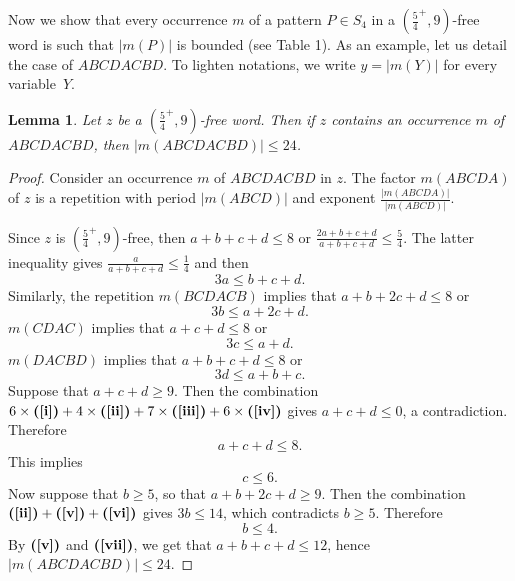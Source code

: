 \documentclass[final]{dmtcs-episciences}
\def\paren#1{\left( #1 \right)}
\renewcommand{\le}{\leqslant}
\renewcommand{\ge}{\geqslant}
\theoremstyle{plain}
\newtheorem{lemma}[theorem]{Lemma}
\theoremstyle{definition}
\theoremstyle{remark}
\begin{document}
Now we show that every occurrence $m$ of a pattern $P\in S_4$ in a $\paren{\tfrac54^+,9}$-free word
is such that $|m(P)|$ is bounded (see Table 1).
%
As an example, let us detail the case of $ABCDACBD$. %
To lighten notations, we write $y=|m(Y)|$ for every variable~$Y$.
\begin{lemma}\label{lem:bounded}
Let $z$ be a $\paren{\tfrac54^+, 9}$-free word. Then if $z$ contains an occurrence $m$ of $ABCDACBD$, then $|m(ABCDACBD)|\le24$.
\end{lemma}

\begin{proof}
Consider an occurrence $m$ of $ABCDACBD$ in $z$. The factor $m(ABCDA)$ of $z$ is a repetition with period $|m(ABCD)|$ and exponent $\tfrac{|m(ABCDA)|}{|m(ABCD)|}$.

Since $z$ is $\paren{\tfrac54^+,9}$-free, then $a+b+c+d\le8$ or $\tfrac{2a+b+c+d}{a+b+c+d}\le\tfrac54$.
The latter inequality gives $\tfrac{a}{a+b+c+d}\le\tfrac14$ and then
\begin{equation}\label{i}
3a\le b+c+d.
\end{equation}
Similarly, the repetition $m(BCDACB)$ implies that $a+b+2c+d\le8$ or
\begin{equation}\label{ii}
3b\le a+2c+d.
\end{equation}
$m(CDAC)$ implies that $a+c+d\le8$ or
\begin{equation}\label{iii}
3c\le a+d.
\end{equation}
$m(DACBD)$ implies that $a+b+c+d\le8$ or
\begin{equation}\label{iv}
3d\le a+b+c.
\end{equation}
Suppose that $a+c+d\ge9$.
Then the combination $6\times\mbox{{\bf(\ref{i})}}+
4\times\mbox{{\bf(\ref{ii})}}+
7\times\mbox{{\bf(\ref{iii})}}+
6\times\mbox{{\bf(\ref{iv})}}$
gives $a+c+d\le0$, a contradiction. Therefore
\begin{equation}\label{v}
a+c+d\le8.
\end{equation}
This implies
\begin{equation}\label{vi}
c\le6.
\end{equation}
Now suppose that $b\ge5$, so that $a+b+2c+d\ge9$.
Then the combination $\mbox{{\bf(\ref{ii})}}+
\mbox{{\bf(\ref{v})}}+
\mbox{{\bf(\ref{vi})}}$
gives $3b\le14$, which contradicts $b\ge5$. Therefore
\begin{equation}\label{vii}
b\le4.
\end{equation}
By $\mbox{{\bf(\ref{v})}}$ and $\mbox{{\bf(\ref{vii})}}$, we get that $a+b+c+d\le 12$, hence $|m(ABCDACBD)|\le 24$.    
\end{proof}
\end{document}
